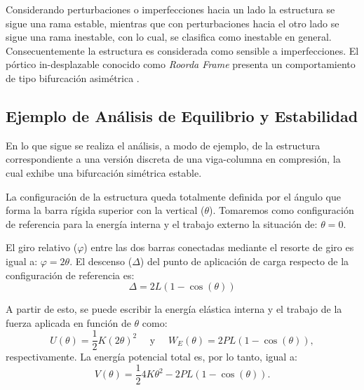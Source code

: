 Considerando perturbaciones o imperfecciones hacia un lado la estructura se sigue una rama estable, mientras que con perturbaciones hacia el otro lado se sigue una rama inestable, con lo cual, se clasifica como inestable en general. %
%
Consecuentemente la estructura es considerada como sensible a imperfecciones. %
El pórtico in-desplazable conocido como \textit{Roorda Frame} presenta un comportamiento de tipo bifurcación asimétrica \citep{thompson1973general}.


\subsection{Ejemplo de Análisis de Equilibrio y Estabilidad}

En lo que sigue se realiza el análisis, a modo de ejemplo, de la estructura correspondiente a una versión discreta de una viga-columna en compresión, la cual exhibe una bifurcación simétrica estable. 


La configuración de la estructura queda totalmente definida por el ángulo que forma la barra rígida superior con la vertical ($\theta$). Tomaremos como configuración de referencia para la energía interna y el trabajo externo la situación de: $\theta=0$.

El giro relativo ($\varphi$) entre las dos barras conectadas mediante el resorte de giro es igual a: $\varphi = 2\theta$. El descenso ($\Delta$) del punto de aplicación de carga respecto de la configuración de referencia es:
%
\begin{equation}\label{SimBif_NL}
\Delta = 2L(1-\cos(\theta))
\end{equation}


A partir de esto, se puede escribir la energía elástica interna y el trabajo de la fuerza aplicada en función de $\theta$ como:
%
\begin{equation}
U(\theta)=\frac{1}{2}K (2\theta)^2 \quad \text{ y }  \quad W_E(\theta) = 2P L(1-\cos(\theta)),
\end{equation}
respectivamente. La energía potencial total es, por lo tanto, igual a:
%
\begin{equation}
V(\theta) = \frac{1}{2}4K \theta^2 - 2PL(1-\cos(\theta)).
\end{equation}

